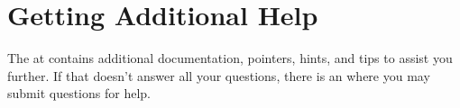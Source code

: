 \section{Getting Additional Help}
The  at  contains additional documentation,
pointers, hints, and tips to assist you further.  If that doesn't answer all your questions,
there is an  where you may submit questions for help.

